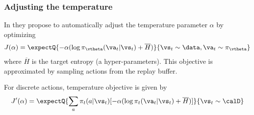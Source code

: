 

\subsubsection{Adjusting the temperature}

In  \citep{Haarnoja2018SAC} they propose to  automatically
adjust the temperature parameter $\alpha$ by optimizing
\begin{align*}
  J(\alpha) = \expectQ{-\alpha(\log \pi_\vtheta(\va_t|\vs_t) + \overline{H})}
  {\vs_t \sim \data, \va_t \sim \pi_{\vtheta}}
  \end{align*}
where $\overline{H}$ is the target entropy (a hyper-parameters).
This objective is approximated by sampling actions from the replay buffer.

For discrete actions,  temperature objective is given by
\begin{align}
  J'(\alpha) = \expectQ{
    \sum_a \pi_t(a|\vs_t) [-\alpha(\log \pi_t(\va_t|\vs_t) + \overline{H})]
    }{\vs_t \sim \calD}
\end{align}







